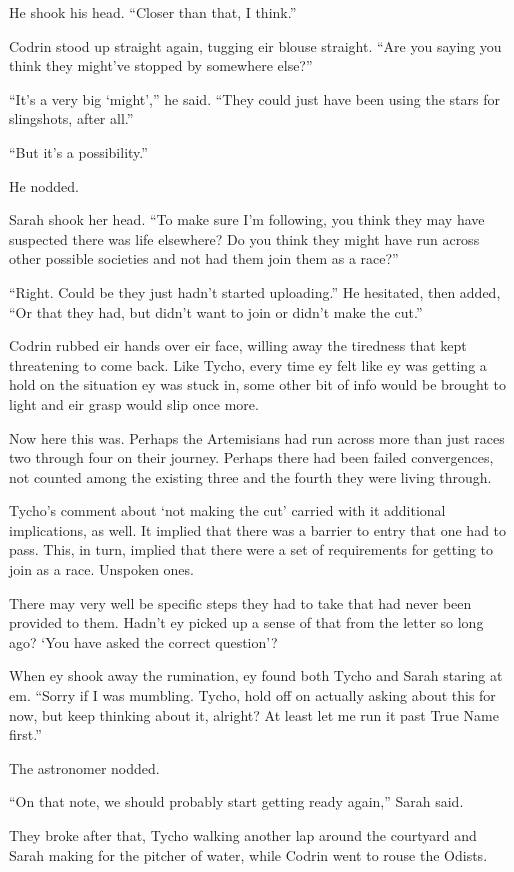 He shook his head. ``Closer than that, I think.''

Codrin stood up straight again, tugging eir blouse straight. ``Are you saying you think they might've stopped by somewhere else?''

``It's a very big `might','' he said. ``They could just have been using the stars for slingshots, after all.''

``But it's a possibility.''

He nodded.

Sarah shook her head. ``To make sure I'm following, you think they may have suspected there was life elsewhere? Do you think they might have run across other possible societies and not had them join them as a race?''

``Right. Could be they just hadn't started uploading.'' He hesitated, then added, ``Or that they had, but didn't want to join or didn't make the cut.''

Codrin rubbed eir hands over eir face, willing away the tiredness that kept threatening to come back. Like Tycho, every time ey felt like ey was getting a hold on the situation ey was stuck in, some other bit of info would be brought to light and eir grasp would slip once more.

Now here this was. Perhaps the Artemisians had run across more than just races two through four on their journey. Perhaps there had been failed convergences, not counted among the existing three and the fourth they were living through.

Tycho's comment about `not making the cut' carried with it additional implications, as well. It implied that there was a barrier to entry that one had to pass. This, in turn, implied that there were a set of requirements for getting to join as a race. Unspoken ones.

There may very well be specific steps they had to take that had never been provided to them. Hadn't ey picked up a sense of that from the letter so long ago? `You have asked the correct question'?

When ey shook away the rumination, ey found both Tycho and Sarah staring at em. ``Sorry if I was mumbling. Tycho, hold off on actually asking about this for now, but keep thinking about it, alright? At least let me run it past True Name first.''

The astronomer nodded.

``On that note, we should probably start getting ready again,'' Sarah said.

They broke after that, Tycho walking another lap around the courtyard and Sarah making for the pitcher of water, while Codrin went to rouse the Odists.

